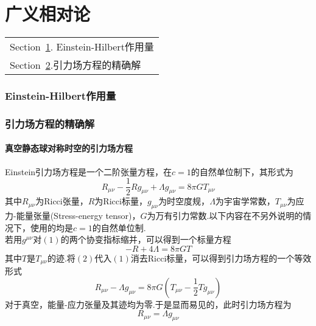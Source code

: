 \part{广义相对论}\label{Part:General_Relativity}
	\begin{margintable}\vspace{1.4in}\footnotesize
		\begin{tabularx}{\marginparwidth}{|X}
			Section~\ref{sec:EHAction}. Einstein-Hilbert作用量\\
			Section~\ref{sec:Exact_Solutions}.引力场方程的精确解\\
		\end{tabularx}
	\end{margintable}
	\section{Einstein-Hilbert作用量}\label{sec:EHAction}

	\section{引力场方程的精确解}\label{sec:Exact_Solutions}
	
	
	
	
	\subsection{真空静态球对称时空的引力场方程}
	Einstein引力场方程是一个二阶张量方程，在$c=1$的自然单位制下，其形式为
	\begin{equation}
		  R_{\mu\nu}-\frac{1}{2}Rg_{\mu\nu}+\Lambda g_{\mu\nu}=8\pi GT_{\mu\nu}
	\end{equation}
	其中$R_{\mu\nu}$为Ricci张量，$R$为Ricci标量，$g_{\mu\nu}$为时空度规，$\Lambda$为宇宙学常数，$T_{\mu\nu}$为应力-能量张量(Stress-energy tensor)，$G$为万有引力常数.以下内容在不另外说明的情况下，使用的均是$c=1$的自然单位制.\\
	若用$g^{\mu\nu}$对$(1)$的两个协变指标缩并，可以得到一个标量方程
	\begin{equation}
		  -R+4\Lambda=8\pi GT
	\end{equation}
	其中$T$是$T_{\mu\nu}$的迹.将$(2)$代入$(1)$消去Ricci标量，可以得到引力场方程的一个等效形式
	\begin{equation}
		  R_{\mu\nu}-\Lambda g_{\mu\nu}=8\pi G(T_{\mu\nu}-\frac{1}{2}Tg_{\mu\nu})
	\end{equation}
	对于真空，能量-应力张量及其迹均为零.于是显而易见的，此时引力场方程为
	\begin{equation}
		  R_{\mu\nu}=\Lambda g_{\mu\nu}
	\end{equation}
	
